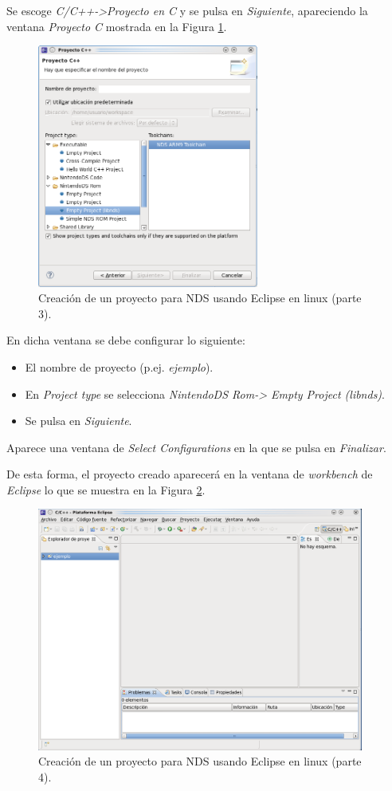 Se escoge \textit{C/C++->Proyecto en C} y se pulsa en \textit{Siguiente}, apareciendo la ventana \textit{Proyecto C} mostrada en la Figura \ref{fig_pig_p3_c1_eclipel3}.

\begin{figure}[t]
	\centering
	\includegraphics[height=8cm]{./Figuras/C2/c2_instan3.png}
	\caption{Creación de un proyecto para NDS usando Eclipse en linux (parte 3).}
	\label{fig_pig_p3_c1_eclipel3}
\end{figure}

En dicha ventana se debe configurar lo siguiente:
 \begin{itemize}
 	\item El nombre de proyecto (p.ej. \textit{ejemplo}).
 	\item En \textit{Project type} se selecciona \textit{NintendoDS Rom-> Empty Project (libnds)}.
 	\item Se pulsa en \textit{Siguiente}.
 \end{itemize}

Aparece una ventana de \textit{Select Configurations} en la que se pulsa en \textit{Finalizar}. 

De esta forma, el  proyecto creado aparecerá en la ventana de \textit{workbench} de \textit{Eclipse} lo que se muestra en la Figura \ref{fig_pig_p3_c1_eclipel4}.

\begin{figure}[t]
	\centering
	\includegraphics[height=8cm]{./Figuras/C2/c2_instan4.png}
	\caption{Creación de un proyecto para NDS usando Eclipse en linux (parte 4).}
	\label{fig_pig_p3_c1_eclipel4}
\end{figure}

